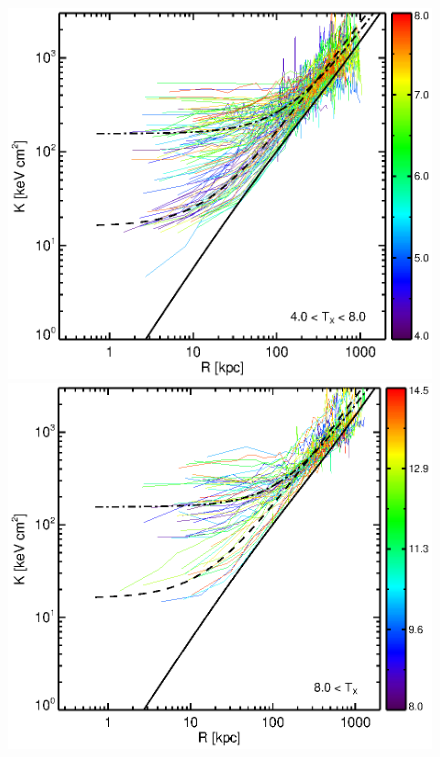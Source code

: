 \begin{center}
\begin{figure}[htp]
\begin{minipage}[htp]{0.5\linewidth}
    \end{minipage}
    \begin{minipage}[htp]{0.5\linewidth}
      \includegraphics*[width=\textwidth, trim=28mm 7mm 30mm 17mm, clip]{splots_gt4tle8.eps}
    \end{minipage}
    \begin{minipage}[htp]{0.5\linewidth}
      \includegraphics*[width=\textwidth, trim=28mm 7mm 30mm 17mm, clip]{splots_tgt8.eps}
    \end{minipage}

\end{figure}
\end{center}
